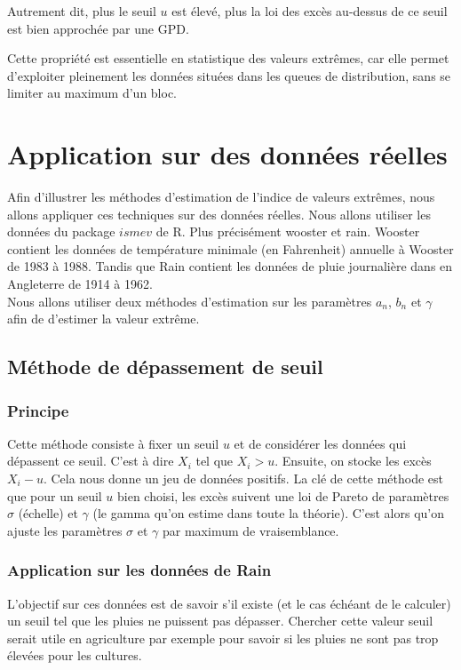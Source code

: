 \documentclass{article}
\begin{document}
Autrement dit, plus le seuil \(u\) est élevé, plus la loi des excès au-dessus de ce seuil est bien approchée par une GPD.

\medskip
Cette propriété est essentielle en statistique des valeurs extrêmes, car elle permet d’exploiter pleinement les données situées dans les queues de distribution, sans se limiter au maximum d’un bloc.

\newpage
\section{Application sur des données réelles}

Afin d'illustrer les méthodes d'estimation de l'indice de valeurs extrêmes, nous allons appliquer ces techniques sur des données réelles.
Nous allons utiliser les données du package $ismev$ de R. Plus précisément wooster et rain. Wooster contient les données de température minimale (en Fahrenheit) annuelle à Wooster de 1983 à 1988.
Tandis que Rain contient les données de pluie journalière dans en Angleterre de 1914 à 1962.
\\
Nous allons utiliser deux méthodes d'estimation sur les paramètres $a_n$, $b_n$ et $\gamma$ afin de d'estimer la valeur extrême.


\subsection{Méthode de dépassement de seuil}

\subsubsection{Principe}

Cette méthode consiste à fixer un seuil $u$ et de considérer les données qui dépassent ce seuil. C'est à dire $X_i$ tel que $X_i > u$.
Ensuite, on stocke les excès $X_i - u$. Cela nous donne un jeu de données positifs.
La clé de cette méthode est que pour un seuil $u$ bien choisi, les excès suivent une loi de Pareto de paramètres $\sigma$ (échelle) et $\gamma$ (le gamma qu'on estime dans toute la théorie).
C'est alors qu'on ajuste les paramètres $\sigma$ et $\gamma$ par maximum de vraisemblance.

\subsubsection{Application sur les données de Rain}

L'objectif sur ces données est de savoir s'il existe (et le cas échéant de le calculer) un seuil tel que les pluies ne puissent pas dépasser.
Chercher cette valeur seuil serait utile en agriculture par exemple pour savoir si les pluies ne sont pas trop élevées pour les cultures.
\end{document}
